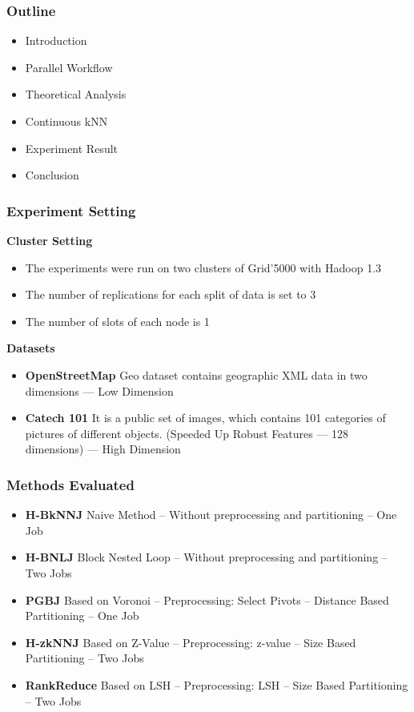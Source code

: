 \begin{frame}
\frametitle{Outline}
	\begin{itemize}
		\item Introduction
		\item Parallel Workflow
		\item Theoretical Analysis
		\item Continuous kNN
		\item Experiment Result
		\item \textcolor{blue!20}{Conclusion}
	\end{itemize}
\end{frame}

\begin{frame}
\frametitle{Experiment Setting}
\textbf{Cluster Setting}
\vspace{-0.1in}
\begin{itemize}
\item The experiments were run on two clusters of Grid'5000 with Hadoop 1.3

\item The number of replications for each split of data is set to 3

\item The number of slots of each node is 1
\end{itemize}
\textbf{Datasets}
\vspace{-0.1in}
\begin{itemize}
\item \textbf{OpenStreetMap} Geo dataset contains geographic XML data in two dimensions  --- Low Dimension
\item \textbf{Catech 101} It is a public set of images, which contains 101 categories of pictures of different objects. (Speeded Up Robust Features --- 128 dimensions) --- High Dimension
\end{itemize}
\end{frame}

\begin{frame}
\frametitle{Methods Evaluated}
\begin{itemize}
\item \textbf{H-BkNNJ} Naive Method -- Without preprocessing and partitioning -- One Job
\item \textbf{H-BNLJ} Block Nested Loop -- Without preprocessing and partitioning -- Two Jobs
\item \textbf{PGBJ} Based on Voronoi -- Preprocessing: Select Pivots -- Distance Based Partitioning -- One Job
\item \textbf{H-zkNNJ} Based on Z-Value -- Preprocessing: z-value -- Size Based Partitioning -- Two Jobs
\item \textbf{RankReduce} Based on LSH -- Preprocessing: LSH -- Size Based Partitioning -- Two Jobs
\end{itemize}
\end{frame}

